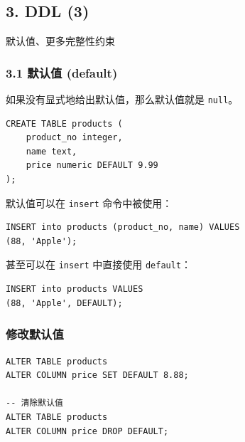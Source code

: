 \documentclass[aspectratio=169, 14pt]{beamer}
\begin{document}
\begin{frame}
	\section{\textcolor{darkmidnightblue}{3. DDL (3)}}
	默认值、更多完整性约束

\end{frame}

\begin{frame}[fragile]
	\frametitle{3.1 默认值 (default)}
	如果没有显式地给出默认值，那么默认值就是 \texttt{null}。

	\begin{verbatim}
CREATE TABLE products (
    product_no integer,
    name text,
    price numeric DEFAULT 9.99
);
\end{verbatim}

\end{frame}

\begin{frame}[fragile]
	默认值可以在 \texttt{insert} 命令中被使用：

	\begin{verbatim}
INSERT into products (product_no, name) VALUES
(88, 'Apple');
    \end{verbatim}

	甚至可以在 \texttt{insert} 中直接使用 \texttt{default}：

	\begin{verbatim}
INSERT into products VALUES
(88, 'Apple', DEFAULT);
\end{verbatim}

\end{frame}

\begin{frame}[fragile]
	\frametitle{修改默认值}

	\begin{verbatim}
ALTER TABLE products 
ALTER COLUMN price SET DEFAULT 8.88;

-- 清除默认值
ALTER TABLE products 
ALTER COLUMN price DROP DEFAULT;
    \end{verbatim}

\end{frame}
\end{document}
